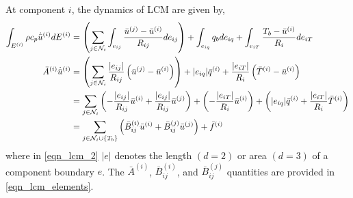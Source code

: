 At component $i$, the dynamics of LCM are given by,
\begin{subequations}
    \begin{align}
        \int_{E^{(i)}}\rho c_p \dot{\bar{u}}^{(i)} dE^{(i)} &= \left(\sum_{j\in\mathcal{N}_i}\int_{e_{ij}}\frac{\bar{u}^{(j)} - \bar{u}^{(i)}}{R_{ij}}de_{ij}\right) + \int_{e_{iq}} q_b de_{iq} + \int_{e_{iT}}\frac{T_b - \bar{u}^{(i)}}{R_i}de_{iT}\label{eqn_lcm_1}\\
        \bar{A}^{(i)}\dot{\bar{u}}^{(i)} &= \left(\sum_{j\in\mathcal{N}_i}\frac{|e_{ij}|}{R_{ij}}\left(\bar{u}^{(j)} - \bar{u}^{(i)}\right)\right) + |e_{iq}|\bar{q}^{(i)} + \frac{|e_{iT}|}{R_i}\left(\bar{T}^{(i)} - \bar{u}^{(i)}\right) \label{eqn_lcm_2}\\ 
        &= \sum_{j\in\mathcal{N}_i}\left(-\frac{|e_{ij}|}{R_{ij}}\bar{u}^{(i)} + \frac{|e_{ij}|}{R_{ij}}\bar{u}^{(j)}\right) + \left(-\frac{|e_{iT}|}{R_{i}}\bar{u}^{(i)}\right) + \left(|e_{iq}|\bar{q}^{(i)} + \frac{|e_{iT}|}{R_i}\bar{T}^{(i)}\right)\label{eqn_lcm_3}\\
        &= \sum_{j\in\mathcal{N}_i\cup\left\{T_b\right\}}\left(\bar{B}^{(i)}_{ij}\bar{u}^{(i)} + \bar{B}^{(j)}_{ij}\bar{u}^{(j)}\right) + \bar{f}^{(i)}\label{eqn_lcm_4}
    \end{align}
\end{subequations}
where in \cref{eqn_lcm_2} $|e|$ denotes the length $(d=2)$ or area $(d=3)$ of a component boundary $e$. The $\bar{A}^{(i)}$, $\bar{B}_{ij}^{(i)}$, and $\bar{B}_{ij}^{(j)}$ quantities are provided in \cref{eqn_lcm_elements}.

